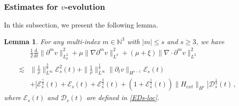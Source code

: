 \documentclass[reqno,11pt]{amsart}
\newtheorem{lemma}{Lemma}[section]
\numberwithin{equation}{section}
\def\d{\mathrm{d}}
\begin{document}
\subsubsection{\bf Estimates for $v$-evolution}

In this subsection, we present the following lemma.

\begin{lemma}\label{Lmm-v-loc}
    For any multi-index $m \in \mathbb{N}^3$ with $|m| \leq s$ and $s \geq 3$, we have
    \begin{equation}\label{v-equation}
	\begin{aligned}
&\frac{1}{2} \frac{\d}{\d t} \|\partial^m v\|_{L^2_\rho}^2 + \mu \|\nabla \partial^m v\|_{L^2}^2 + (\mu + \xi) \|\nabla \cdot \partial^m v\|_{L^2}^2 \\
\lesssim & \| \frac{1}{\rho} \|_{L^\infty}^{\frac{3}{2}} \mathcal{E}_s^2 (t) + \| \frac{1}{\rho} \|_{L^\infty}^{\frac{1}{2}} \|\partial_t v\|_{H^{s - 1}} \mathcal{E}_s (t) \\
& + \big[ \mathcal{E}_s^\frac{\gamma}{2} (t) + \mathcal{E}_s (t) + \mathcal{E}_s^\frac{3}{2} (t) + ( 1 + \mathcal{E}_s^\frac{1}{2} (t) ) \|H_{ext}\|_{H^s} \big] \mathcal{D}_s^\frac{1}{2} (t) \,,
	\end{aligned}
\end{equation}
where $\mathcal{E}_s (t)$ and $\mathcal{D}_s (t)$ are defined in \eqref{EDs-loc}.
\end{lemma}
\end{document}
